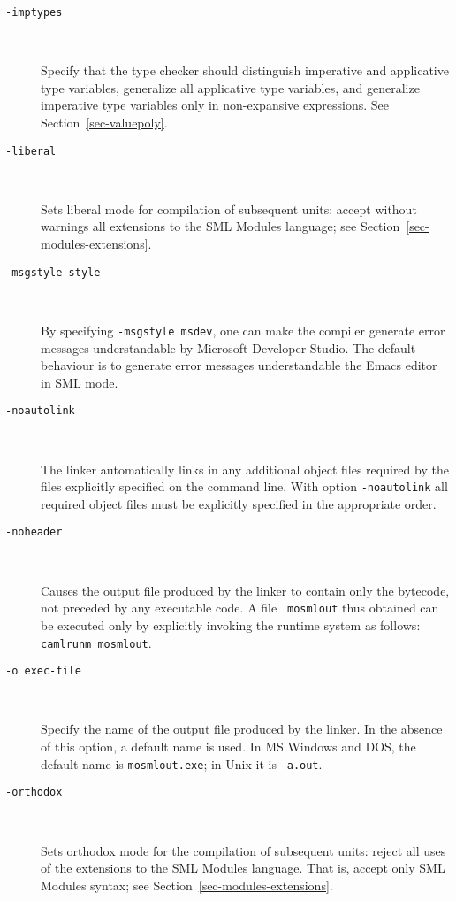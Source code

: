 \documentclass[fleqn]{article}
\begin{document}
\begin{description}
\item[{\tt -imptypes}]\mbox{ }

  Specify that the type checker should distinguish imperative and
  applicative type variables, generalize all applicative type
  variables, and generalize imperative type variables only in
  non-expansive expressions.  See Section~\ref{sec-valuepoly}.

\item[{\tt -liberal}]\mbox{ }
  
  Sets liberal mode for compilation of subsequent units: accept
  without warnings all extensions to the SML Modules language; see
  Section~\ref{sec-modules-extensions}.

\item[{\tt -msgstyle \textrm{style}}]\mbox{ }
  
  By specifying \texttt{-msgstyle msdev}, one can make the compiler
  generate error messages understandable by Microsoft Developer
  Studio.  The default behaviour is to generate error messages
  understandable the Emacs editor in SML mode.

\item[{\tt -noautolink}]\mbox{ }
  
  The linker automatically links in any additional object files
  required by the files explicitly specified on the command line.
  With option {\tt -noautolink} all required object files must be
  explicitly specified in the appropriate order.

\item[{\tt -noheader}]\mbox{ }

  Causes the output file produced by the linker to contain only the
  bytecode, not preceded by any executable code.  A file {\tt
    mosmlout} thus obtained can be executed only by explicitly
  invoking the runtime system as follows: {\tt camlrunm mosmlout}.

\item[{\tt -o {\rm exec-file}}]\mbox{ }

  Specify the name of the output file produced by the linker.  In the
  absence of this option, a default name is used.  In MS Windows and
  DOS, the default name is {\tt mosmlout.exe}; in Unix it is {\tt
    a.out}.

\item[{\tt -orthodox}]\mbox{ }
  
  Sets orthodox mode for the compilation of subsequent units: reject
  all uses of the extensions to the SML Modules language.  That is,
  accept only SML Modules syntax; see
  Section~\ref{sec-modules-extensions}.


\end{description}
\end{document}
